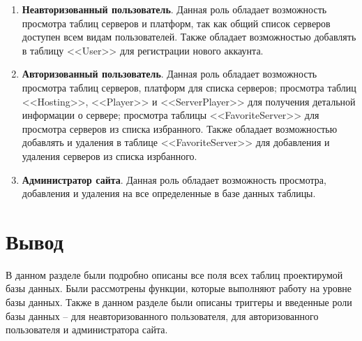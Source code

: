 \begin{enumerate}
    \item \textbf{Неавторизованный пользователь}. Данная роль обладает возможность просмотра таблиц серверов и платформ, так как общий список серверов доступен всем видам пользователей. Также обладает возможностью добавлять в таблицу <<User>> для регистрации нового аккаунта.
    \item \textbf{Авторизованный пользователь}. Данная роль обладает возможность просмотра таблиц серверов, платформ для списка серверов; просмотра таблиц <<Hosting>>, <<Player>> и <<ServerPlayer>> для получения детальной информации о сервере; просмотра таблицы <<FavoriteServer>> для просмотра серверов из списка избранного. Также обладает возможностью добавлять и удаления в таблице <<FavoriteServer>> для добавления и удаления серверов из списка изрбанного.
    \item \textbf{Администратор сайта}. Данная роль обладает возможность просмотра, добавления и удаления на все определенные в базе данных таблицы.
\end{enumerate}


\section*{Вывод}

В данном разделе были подробно описаны все поля всех таблиц проектирумой базы данных. Были рассмотрены функции, которые выполняют работу на уровне базы данных. Также в данном разделе были описаны триггеры и введенные роли базы данных -- для неавторизованного пользователя, для авторизованного пользователя и администратора сайта.
